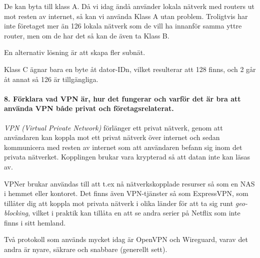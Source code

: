 De kan byta till klass A. Då vi idag ändå använder lokala nätverk med routers ut mot resten av internet, så kan vi använda Klass A utan problem. Troligtvis har inte företaget mer än 126 lokala nätverk som de vill ha innanför samma yttre router, men om de har det så kan de även ta Klass B.

En alternativ lösning är att skapa fler subnät.

Klass C ägnar bara en byte åt dator-IDn, vilket resulterar att 128 finns, och 2 går åt annat så 126 är tillgängliga.

\paragraph{8. Förklara vad VPN är, hur det fungerar och varför det är bra att använda VPN både privat och företagsrelaterat.}

\textit{VPN (Virtual Private Network)} förlänger ett privat nätverk, genom att användaren kan koppla mot ett privat nätverk över internet och sedan kommunicera med resten av internet som att användaren befann sig inom det privata nätverket. Kopplingen brukar vara krypterad så att datan inte kan läsas av.

VPNer brukar användas till att t.ex nå nätverkskopplade resurser så som en NAS i hemmet eller kontoret. Det finns även VPN-tjänster så som ExpressVPN, som tillåter dig att koppla mot privata nätverk i olika länder för att ta sig runt \textit{geo-blocking}, vilket i praktik kan tillåta en att se andra serier på Netflix som inte finns i sitt hemland.

Två protokoll som används mycket idag är OpenVPN och Wireguard, varav det andra är nyare, säkrare och snabbare (generellt sett).
















